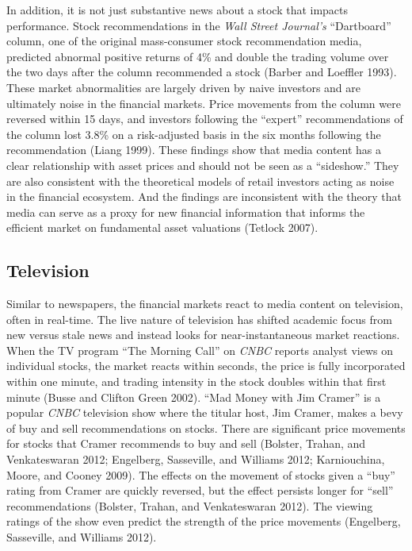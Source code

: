 \documentclass[12pt,]{article}
\begin{document}
In addition, it is not just substantive news about a stock that impacts
performance. Stock recommendations in the \emph{Wall Street Journal's}
``Dartboard'' column, one of the original mass-consumer stock
recommendation media, predicted abnormal positive returns of 4\% and
double the trading volume over the two days after the column recommended
a stock (Barber and Loeffler 1993). These market abnormalities are
largely driven by naive investors and are ultimately noise in the
financial markets. Price movements from the column were reversed within
15 days, and investors following the ``expert'' recommendations of the
column lost 3.8\% on a risk-adjusted basis in the six months following
the recommendation (Liang 1999). These findings show that media content
has a clear relationship with asset prices and should not be seen as a
``sideshow.'' They are also consistent with the theoretical models of
retail investors acting as noise in the financial ecosystem. And the
findings are inconsistent with the theory that media can serve as a
proxy for new financial information that informs the efficient market on
fundamental asset valuations (Tetlock 2007).

\hypertarget{television}{%
\subsection{Television}\label{television}}

Similar to newspapers, the financial markets react to media content on
television, often in real-time. The live nature of television has
shifted academic focus from new versus stale news and instead looks for
near-instantaneous market reactions. When the TV program ``The Morning
Call'' on \emph{CNBC} reports analyst views on individual stocks, the
market reacts within seconds, the price is fully incorporated within one
minute, and trading intensity in the stock doubles within that first
minute (Busse and Clifton Green 2002). ``Mad Money with Jim Cramer'' is
a popular \emph{CNBC} television show where the titular host, Jim
Cramer, makes a bevy of buy and sell recommendations on stocks. There
are significant price movements for stocks that Cramer recommends to buy
and sell (Bolster, Trahan, and Venkateswaran 2012; Engelberg,
Sasseville, and Williams 2012; Karniouchina, Moore, and Cooney 2009).
The effects on the movement of stocks given a ``buy'' rating from Cramer
are quickly reversed, but the effect persists longer for ``sell''
recommendations (Bolster, Trahan, and Venkateswaran 2012). The viewing
ratings of the show even predict the strength of the price movements
(Engelberg, Sasseville, and Williams 2012).
\end{document}
